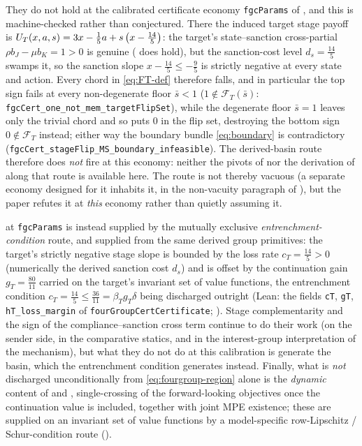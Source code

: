 They do not hold at the calibrated certificate economy
\texttt{fgcParams} of , and this is
machine-checked rather than conjectured. There the induced target stage
payoff is $U_T(x,a,s)=3x-\tfrac15 a+s\,\bigl(x-\tfrac{14}{5}\bigr)$:
the target's state--sanction cross-partial $\rho b_J-\mu b_K=1>0$ is genuine
( does hold), but the sanction-cost level
$d_s=\tfrac{14}{5}$ swamps it, so the sanction slope
$x-\tfrac{14}{5}\le-\tfrac95$ is strictly negative at every state and
action. Every chord in \eqref{eq:FT-def} therefore falls, and in
particular the top sign fails at every non-degenerate floor $\bar s<1$
($1\notin\mathcal F_T(\bar s)$:
\texttt{fgcCert\_one\_not\_mem\_targetFlipSet}), while the degenerate
floor $\bar s=1$ leaves only the trivial chord and so puts $0$ in the
flip set, destroying the bottom sign $0\notin\mathcal F_T$ instead;
either way the boundary bundle \eqref{eq:boundary} is contradictory
(\texttt{fgcCert\_stageFlip\_MS\_boundary\_infeasible}). The derived-basin
route therefore does \emph{not} fire at this economy: neither the
pivots of  nor the derivation of  along that
route is available here. The route is not thereby vacuous
(a separate economy designed for it inhabits it, in the
non-vacuity paragraph of ), but the paper refutes it
at \emph{this} economy rather than quietly assuming it.

 at \texttt{fgcParams} is instead supplied by the
mutually exclusive \emph{entrenchment-condition} route, and supplied from the same
derived group primitives: the target's strictly negative stage slope is
bounded by the loss rate $c_T=\tfrac{14}{5}>0$ (numerically the derived
sanction cost $d_s$) and is offset by the continuation gain
$g_T=\tfrac{80}{11}$ carried on the target's invariant set of value functions, the entrenchment condition
$c_T=\tfrac{14}{5}\le\tfrac{36}{11}=\beta_T g_T\delta$ being discharged
outright (Lean: the fields \texttt{cT}, \texttt{gT},
\texttt{hT\_loss\_margin} of \texttt{fourGroupCertCertificate};
). Stage complementarity and the sign
of the compliance--sanction cross term continue to do their work (on the sender side, in the
comparative statics, and in the interest-group interpretation of the mechanism),
but what they do not do at this calibration is generate the basin,
which the entrenchment condition generates instead. Finally, what is
\emph{not} discharged unconditionally from \eqref{eq:fourgroup-region}
alone is the \emph{dynamic} content of  and
, single-crossing of the forward-looking objectives
once the continuation value is included, together with joint MPE
existence; these are supplied on an invariant set of value functions by a
model-specific row-Lipschitz / Schur-condition route
().

